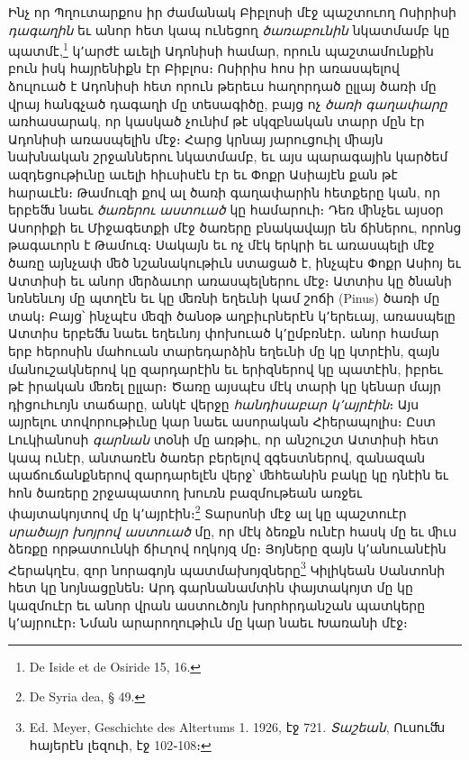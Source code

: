 \documentclass{article}
\begin{document}
{Ինչ որ Պղուտարքոս իր ժամանակ Բիբլոսի մէջ պաշտուող Ոսիրիսի \emph{դագաղին} եւ անոր հետ կապ ունեցող \emph{ծառաբունին} նկատմամբ կը պատմէ,\footnote{De Iside et de Osiride 15, 16.} կ՚արժէ աւելի Ադոնիսի համար, որուն պաշտամունքին բուն իսկ հայրենիքն էր Բիբլոս։ Ոսիրիս հոս իր առասպելով ձուլուած է Ադոնիսի հետ որուն թերեւս հաղորդած ըլլայ ծառի մը վրայ հանգչած դագաղի մը տեսագիծը, բայց ոչ \emph{ծառի գաղափարը} առհասարակ, որ կասկած չունիմ թէ սկզբնական տարր մըն էր Ադոնիսի առասպելին մէջ։ Հարց կրնայ յարուցուիլ ﬕայն նախնական շրջաններու նկատմամբ, եւ այս պարագային կարծեմ ազդեցութիւնը աւելի հիւսիսէն էր եւ Փոքր Ասիայէն քան թէ հարաւէն։ Թամուզի քով ալ ծառի գաղափարին հետքերը կան, որ երբեﬓ նաեւ \emph{ծառերու աստուած} կը համարուի։ Դեռ ﬕնչեւ այսօր Ասորիքի եւ Միջագետքի մէջ ծառերը բնակավայր են ճիներու, որոնց թագաւորն է Թամուզ։ Սակայն եւ ոչ մէկ երկրի եւ առասպելի մէջ ծառը այնչափ ﬔծ նշանակութիւն ստացած է, ինչպէս Փոքր Ասիոյ եւ Ատտիսի եւ անոր ﬔրձաւոր առասպելներու մէջ։ Ատտիս կը ծնանի նռնենւոյ մը պտղէն եւ կը ﬔռնի եղեւնի կամ շոճի (Pinus) ծառի մը տակ։ Բայց՝ ինչպէս ﬔզի ծանօթ աղբիւրներէն կ՚երեւայ, առասպելը Ատտիս երբեﬓ նաեւ եղեւնոյ փոխուած կ՚ըմբռնէր․ անոր համար երբ հերոսին մահուան տարեդարձին եղեւնի մը կը կտրէին, զայն մանուշակներով կը զարդարէին եւ երիզներով կը պատէին, իբրեւ թէ իրական ﬔռել ըլլար։ Ծառը այսպէս մէկ տարի կը կենար մայր դիցուհւոյն տաճարը, անկէ վերջը \emph{հանդիսաբար կ՚այրէին}։ Այս այրելու տովորութիւնը կար նաեւ ասորական Հիերապոլիս։ Ըստ Լուկիանոսի \emph{գարնան} տօնի մը առթիւ, որ անշուշտ Ատտիսի հետ կապ ունէր, անտառէն ծառեր բերելով զգեստներով, զանազան պաճուճանքներով զարդարելէն վերջ՝ ﬔհեանին բակը կը դնէին եւ հոն ծառերը շրջապատող խուռն բազմութեան առջեւ փայտակոյտով մը կ՚այրէին։\footnote{De Syria dea, § 49.} Տարսոնի մէջ ալ կը պաշտուէր \emph{սրածայր խոյրով աստուած} մը, որ մէկ ձեռքն ունէր հասկ մը եւ ﬕւս ձեռքը որթատունկի ճիւղով ողկոյզ մը։ Յոյները զայն կ՚անուանէին Հերակղէս, զոր նորագոյն պատմախոյզները\footnote{Ed. Meyer, Geschichte des Altertums 1. 1926, էջ 721. \emph{Տաշեան}, Ուսուﬓ հայերէն լեզուի, էջ 102֊108։} Կիլիկեան Սանտոնի հետ կը նոյնացընեն։ Արդ գարնանամտին փայտակոյտ մը կը կազմուէր եւ անոր վրան աստուծոյն խորհրդանշան պատկերը կ՚այրուէր։ Նման արարողութիւն մը կար նաեւ Խառանի մէջ։

}
\end{document}
